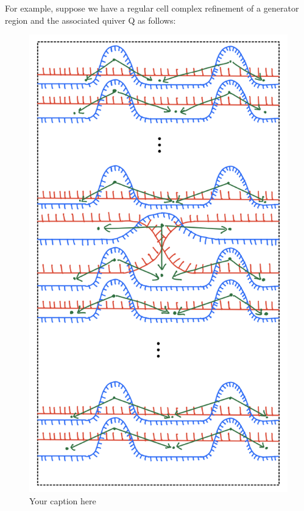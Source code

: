 For example, suppose we have a regular cell complex refinement of a generator region and the associated quiver Q as follows:
\begin{figure}[H] %
    \centering
    \includegraphics[scale = 0.95]{diagrams/local_systems_on_as_diagrams/3.png} %
    \caption{Your caption here}
    \label{fig:your-label}
\end{figure}

